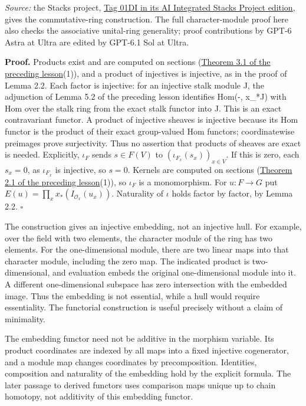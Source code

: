 \documentclass[
  english,
  11pt,
  a4paper,
]{article}
\begin{document}
\emph{Source:} the Stacks project,
\href{https://github.com/KokunoYumeto/unofficial-stacks-project-ai-drafts/blob/565b10e987aba5969b21145a0833f42d69f96790/injectives.tex\#L498}{Tag
01DI in its AI Integrated Stacks Project edition}, gives the
commutative-ring construction. The full character-module proof here also
checks the associative unital-ring generality; proof contributions by
GPT-6 Astra at Ultra are edited by GPT-6.1 Sol at Ultra.

\textbf{Proof.} Products exist and are computed on sections
(\hyperref[sheaves-of-modules-on-a-ringed-space--3-limits-colimits-stalks-and-sections-of-sums]{Theorem
3.1 of the preceding lesson}(1)), and a product of injectives is
injective, as in the proof of Lemma 2.2. Each factor is injective: for
an injective stalk module J, the adjunction of Lemma 5.2 of the
preceding lesson identifies Hom(-, x\_*J) with Hom over the stalk ring
from the exact stalk functor into J. This is an exact contravariant
functor. A product of injective sheaves is injective because its Hom
functor is the product of their exact group-valued Hom functors;
coordinatewise preimages prove surjectivity. Thus no assertion that
products of sheaves are exact is needed. Explicitly, \(\iota_F\) sends
\(s\in F(V)\) to \((\iota_{F_x}(s_x))_{x\in V}\). If this is zero, each
\(s_x=0\), as \(\iota_{F_x}\) is injective, so \(s=0\). Kernels are
computed on sections
(\hyperref[sheaves-of-modules-on-a-ringed-space--2-the-abelian-category-of-module-sheaves]{Theorem
2.1 of the preceding lesson}(1)), so \(\iota_F\) is a monomorphism. For
\(u:F\to G\) put \(E(u)=\prod_xx_*(I_{\mathcal O_x}(u_x))\). Naturality
of \(\iota\) holds factor by factor, by Lemma 2.2. \(\square\)

The construction gives an injective embedding, not an injective hull.
For example, over the field with two elements, the character module of
the ring has two elements. For the one-dimensional module, there are two
linear maps into that character module, including the zero map. The
indicated product is two-dimensional, and evaluation embeds the original
one-dimensional module into it. A different one-dimensional subspace has
zero intersection with the embedded image. Thus the embedding is not
essential, while a hull would require essentiality. The functorial
construction is useful precisely without a claim of minimality.

The embedding functor need not be additive in the morphism variable. Its
product coordinates are indexed by all maps into a fixed injective
cogenerator, and a module map changes coordinates by precomposition.
Identities, composition and naturality of the embedding hold by the
explicit formula. The later passage to derived functors uses comparison
maps unique up to chain homotopy, not additivity of this embedding
functor.
\end{document}
